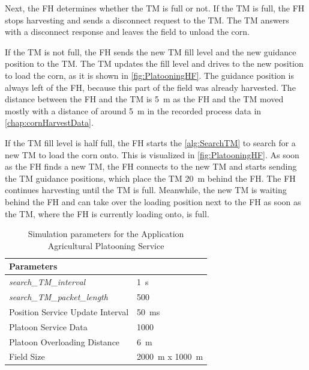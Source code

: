 Next, the \ac{FH} determines whether the \ac{TM} is full or not.
If the \ac{TM} is full, the \ac{FH} stops harvesting and sends a disconnect request to the \ac{TM}.
The \ac{TM} answers with a disconnect response and leaves the field to unload the corn.

If the \ac{TM} is not full, the \ac{FH} sends the new \ac{TM} fill level and the new guidance position to the \ac{TM}.
The \ac{TM} updates the fill level and drives to the new position to load the corn, as it is shown in \autoref{fig:PlatooningHF}.
The guidance position is always left of the \ac{FH}, because this part of the field was already harvested.
The distance between the \ac{FH} and the \ac{TM} is \SI{5}{\metre} as the \ac{FH} and the \ac{TM} moved mostly with a distance of around \SI{5}{\metre} in
the recorded process data in \autoref{chap:cornHarvestData}.

If the \ac{TM} fill level is half full, the \ac{FH} starts the \autoref{alg:SearchTM}
to search for a new \ac{TM} to load the corn onto. This is visualized in \autoref{fig:PlatooningHF}.
As soon as the \ac{FH} finds a new \ac{TM}, the \ac{FH} connects to the new \ac{TM} and starts sending
the \ac{TM} guidance positions, which place the \ac{TM} \SI{20}{\metre} behind the \ac{FH}.
The \ac{FH} continues harvesting until the \ac{TM} is full.
Meanwhile, the new \ac{TM} is waiting behind the \ac{FH} and can take over the loading position next to the \ac{FH} as
soon as the \ac{TM}, where the \ac{FH} is currently loading onto, is full.






\begin{table}[H]
	\centering
	\begin{tabular}{p{5cm}p{4cm}}
		\toprule
		Parameters & \\
		\midrule
		\textit{search\_TM\_interval} & \SI{1}{\second}\\
		\textit{search\_TM\_packet\_length} & \SI{500}{\byte}\\
		Position Service Update Interval & \SI{50}{\milli\second}\\
		Platoon Service Data & \SI{1000}{\byte}\\
		Platoon Overloading Distance & \SI{6}{\meter}\\
		Field Size & \SI{2000}{\meter} x \SI{1000}{\meter}\\
		\bottomrule
	\end{tabular}
	\caption{Simulation parameters for the Application Agricultural Platooning Service}
	\label{tab:SimulationParameters}
\end{table}


